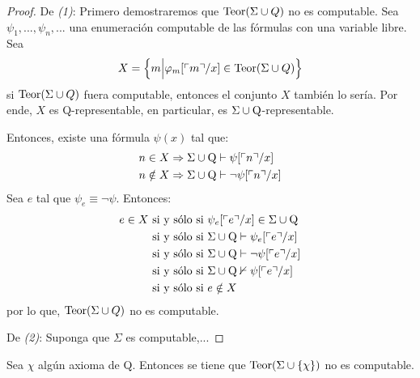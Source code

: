 \documentclass[12pt]{report}
\newcounter{it}
\theoremstyle{largebreak}
\newcommand{\winecomma}[1]{\ensuremath{\ulcorner#1\urcorner}}
\begin{document}
    \begin{proof}
        De \textit{(1)}: Primero demostraremos que $\textup{Teor}(\Sigma\cup Q)$ no es computable. Sea $\psi_1,...,\psi_n,...$ una enumeración computable de las fórmulas con una variable libre. Sea
        \begin{equation*}
            X=\left\{m\Big|\varphi_m[\winecomma{m}/x]\in\textup{Teor}(\Sigma\cup Q) \right\}
        \end{equation*}
        si $\textup{Teor}(\Sigma\cup Q)$ fuera computable, entonces el conjunto $X$ también lo sería. Por ende, $X$ es Q-representable, en particular, es $\Sigma\cup\textup{Q}$-representable.

        Entonces, existe una fórmula $\psi(x)$ tal que:
        \begin{equation*}
            \begin{split}
                n\in X&\Rightarrow \Sigma\cup\textup{Q}\vdash\psi[\winecomma{n}/x]\\
                n\notin X&\Rightarrow \Sigma\cup\textup{Q}\vdash\neg\psi[\winecomma{n}/x]\\
            \end{split}
        \end{equation*}
        Sea $e$ tal que $\psi_e\equiv\neg\psi$. Entonces:
        \begin{equation*}
            \begin{split}
                e\in X&\textup{ si y sólo si }\psi_e[\winecomma{e}/x]\in\Sigma\cup\textup{Q}\\
                &\textup{ si y sólo si }\Sigma\cup\textup{Q}\vdash \psi_e[\winecomma{e}/x]\\
                &\textup{ si y sólo si }\Sigma\cup\textup{Q}\vdash\neg\psi[\winecomma{e}/x]\\
                &\textup{ si y sólo si }\Sigma\cup\textup{Q}\nvdash\psi[\winecomma{e}/x]\\
                &\textup{ si y sólo si }e\notin X\\
            \end{split}
        \end{equation*}
        por lo que, $\textup{Teor}(\Sigma\cup Q)$ no es computable.

        De \textit{(2)}: Suponga que $\Sigma$ es computable,...
    \end{proof}

    Sea $\chi$ algún axioma de Q. Entonces se tiene que $\textup{Teor}(\Sigma\cup\left\{\chi\right\})$ no es computable.
\end{document}
